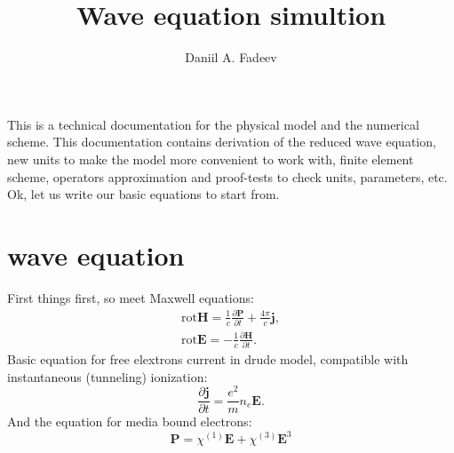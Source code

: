 \documentclass{article}
\title{Wave equation simultion} %
\author{Daniil A. Fadeev}
\newcommand{\dd}{\partial}
\newcommand{\ff}{\frac}
\newcommand{\vv}{\mathbf}
\newcommand{\chiO}{\chi^{(1)}}
\newcommand{\chiT}{\chi^{(3)}}
\begin{document}
\maketitle
This is a technical documentation for the physical model and the numerical scheme. This documentation contains derivation of the reduced wave equation, new units to make the model more convenient to work with, finite element scheme, operators approximation and proof-tests to check units, parameters, etc. Ok, let us write our basic equations to start from.






\section{wave equation}
First things first, so meet Maxwell equations:
\begin{eqnarray}
\mathrm{rot} \vv{H} = \ff{1}{c}\ff{\dd \vv{P}}{\dd t}+\ff{4\pi}{c} \vv{j}, \\
\mathrm{rot} \vv{E} = - \ff{1}{c}\ff{\dd \vv{H}}{\dd t}.
\end{eqnarray}
Basic equation for free elextrons current in drude model, compatible with instantaneous (tunneling) ionization:
\begin{equation}
\ff{\dd \vv{j}}{\dd t}=\ff{e^2}{m} n_e \vv{E}.
\end{equation}
And the equation for media bound electrons:
\begin{equation}
\vv{P} = \chiO \vv{E} + \chiT \vv E^3
\end{equation}
\end{document}
